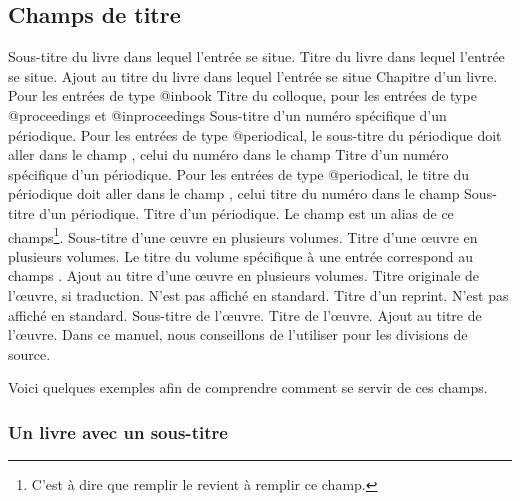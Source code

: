 \subsection{Champs de titre}


\begin{fieldlist}
	Sous-titre du livre dans lequel l'entrée se situe. 
   	 Titre du livre dans lequel l'entrée se situe. 		
   	 Ajout au titre du livre dans lequel l'entrée se situe 
   	 Chapitre d'un livre. Pour les entrées de type @inbook	
   	 Titre du colloque, pour les entrées de type @proceedings et @inproceedings 
   	 Sous-titre d'un numéro spécifique d'un périodique. 	Pour les entrées de type @periodical, le sous-titre du périodique doit aller dans le champ , celui du numéro dans le champ 		
   	 Titre d'un numéro spécifique d'un périodique. Pour les entrées de type @periodical, le titre du périodique doit aller dans le champ , celui titre du numéro dans le champ 		
   	 Sous-titre d'un périodique.							
   	 Titre d'un périodique. Le champ  est un alias de ce champs\footnote{C'est à dire que remplir le  revient à remplir ce champ.}.							
   	 Sous-titre d'une œuvre en plusieurs volumes.			
   	 Titre d'une œuvre en plusieurs volumes. Le titre du volume spécifique à une entrée correspond au champs .						
   	  Ajout au titre d'une œuvre en plusieurs volumes.		
   	 Titre originale de l'œuvre, si traduction. N'est pas affiché en standard. 
   	 Titre d'un reprint. N'est pas affiché en standard.	
   	 Sous-titre de l'œuvre.									
   	 Titre de l'œuvre.									
   	 Ajout au titre de l'œuvre. Dans ce manuel, nous conseillons de l'utiliser pour les divisions de source. 
\end{fieldlist}

Voici quelques exemples afin de comprendre comment se servir de ces champs.

\subsubsection{Un livre avec un sous-titre}

